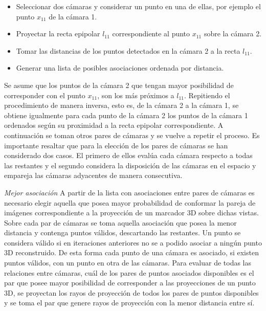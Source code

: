 \begin{itemize}
\item Seleccionar dos cámaras y considerar un punto en una de ellas, por ejemplo el punto $x_{11}$ de la cámara 1.
\item Proyectar la recta epipolar $l_{11}$ correspondiente al punto $x_{11}$ sobre la cámara 2.
\item Tomar las distancias de los puntos detectados en la cámara 2 a la recta $l_{11}$.
\item Generar una lista de posibles asociaciones ordenada por distancia.
\end{itemize}
Se asume que los puntos de la cámara 2 que tengan mayor posibilidad de corresponder con el punto $x_{11}$, son los más próximos a $l_{11}$.
Repitiendo el procedimiento de manera inversa, esto es, de la cámara 2 a la cámara 1, se obtiene igualmente para cada punto de la cámara 2  los puntos de la cámara 1 ordenados según su proximidad a la recta epipolar correspondiente. A continuación se toman otros pares de cámaras y se vuelve a repetir el proceso. 
%
Es importante resaltar que para la elección de los pares de cámaras se han considerado dos casos.
El primero de ellos evalúa cada cámara respecto a todas las restantes y el segundo considera la disposición de las cámaras en el espacio y empareja las cámaras adyacentes de manera consecutiva.

\textit{Mejor asociación}\label{MejorAsociacion}
%
A partir de la lista con asociaciones entre pares de cámaras es necesario elegir aquella que posea mayor probabilidad de conformar la pareja de imágenes correspondiente a la proyección de un marcador 3D sobre dichas vistas.
%
Sobre cada par de cámaras se toma aquella asociación que posea la menor distancia y contenga puntos válidos, descartando las restantes. Un punto se considera válido si en iteraciones anteriores no se a podido asociar a ningún punto 3D reconstruido.
De esta forma cada punto de una cámara es asociado, si existen puntos válidos, con un punto en otra de las cámaras.
%
Para evaluar de todas las relaciones entre cámaras, cuál de los pares de puntos asociados disponibles es el par que posee mayor posibilidad de corresponder a las proyecciones de un punto 3D, se proyectan los rayos de proyección de todos los pares de puntos disponibles y se toma el par que genere rayos de proyección con la menor distancia entre sí.

